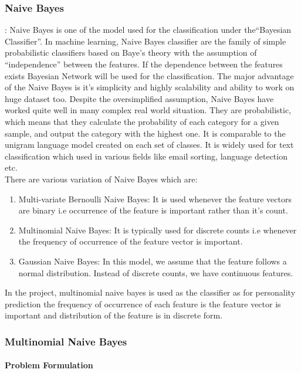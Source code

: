 \subsubsection{ Naive Bayes}: 
Naive Bayes is one of the model used for the classification under the``Bayesian Classifier''. In machine learning, Naive Bayes classifier are the family of simple probabilistic classifiers based on Baye's theory with the assumption of ``independence'' between the features. If the dependence between the features exists Bayesian Network will be used for the classification. The major advantage of the Naive Bayes is it's simplicity and highly scalability and ability to work on huge dataset too. Despite the oversimplified assumption, Naive Bayes have worked quite well in many complex real world situation.
They are probabilistic, which means that they calculate the probability of each category for a given sample, and output the category with the highest one. It is comparable to the unigram language model created on each set of classes. It is widely used for text classification which used in various fields like email sorting, language detection etc. \\
There are various variation of Naive Bayes which are:
\begin{enumerate}
\item Multi-variate Bernoulli Naive Bayes: It is used whenever the feature vectors are binary i.e occurrence of the feature is important rather than it's count.
\item Multinomial Naive Bayes: It is typically used for discrete counts i.e whenever the frequency of occurrence of the feature vector is important.
\item Gaussian Naive Bayes: In this model, we assume that the feature follows a normal distribution. Instead of discrete counts, we have continuous features.
\end{enumerate}
In the project, multinomial naive bayes is used as the classifier as for personality prediction the frequency of occurrence of each feature is the feature vector is important and distribution of the feature is in discrete form.

\subsubsection{Multinomial Naive Bayes}
\paragraph{Problem Formulation}\hfill 

